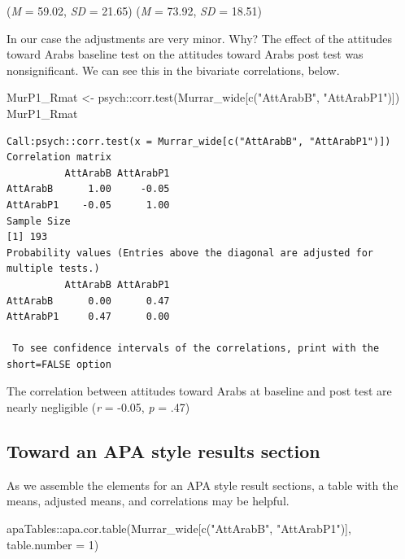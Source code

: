 \documentclass[
  11pt,
]{book}
\newenvironment{Shaded}{\begin{snugshade}}{\end{snugshade}}
\newcommand{\AttributeTok}[1]{\textcolor[rgb]{0.77,0.63,0.00}{#1}}
\newcommand{\DecValTok}[1]{\textcolor[rgb]{0.00,0.00,0.81}{#1}}
\newcommand{\FunctionTok}[1]{\textcolor[rgb]{0.00,0.00,0.00}{#1}}
\newcommand{\NormalTok}[1]{#1}
\newcommand{\OtherTok}[1]{\textcolor[rgb]{0.56,0.35,0.01}{#1}}
\newcommand{\SpecialCharTok}[1]{\textcolor[rgb]{0.00,0.00,0.00}{#1}}
\newcommand{\StringTok}[1]{\textcolor[rgb]{0.31,0.60,0.02}{#1}}
\begin{document}
(\emph{M} = 59.02, \emph{SD} = 21.65)
(\emph{M} = 73.92, \emph{SD} = 18.51)

In our case the adjustments are very minor. Why? The effect of the attitudes toward Arabs baseline test on the attitudes toward Arabs post test was nonsignificant. We can see this in the bivariate correlations, below.

\begin{Shaded}
\begin{Highlighting}[]
\NormalTok{MurP1\_Rmat }\OtherTok{\textless{}{-}}\NormalTok{ psych}\SpecialCharTok{::}\FunctionTok{corr.test}\NormalTok{(Murrar\_wide[}\FunctionTok{c}\NormalTok{(}\StringTok{"AttArabB"}\NormalTok{, }\StringTok{"AttArabP1"}\NormalTok{)])}
\NormalTok{MurP1\_Rmat}
\end{Highlighting}
\end{Shaded}

\begin{verbatim}
Call:psych::corr.test(x = Murrar_wide[c("AttArabB", "AttArabP1")])
Correlation matrix 
          AttArabB AttArabP1
AttArabB      1.00     -0.05
AttArabP1    -0.05      1.00
Sample Size 
[1] 193
Probability values (Entries above the diagonal are adjusted for multiple tests.) 
          AttArabB AttArabP1
AttArabB      0.00      0.47
AttArabP1     0.47      0.00

 To see confidence intervals of the correlations, print with the short=FALSE option
\end{verbatim}

The correlation between attitudes toward Arabs at baseline and post test are nearly negligible (\emph{r} = -0.05, \emph{p} = .47)

\hypertarget{toward-an-apa-style-results-section}{%
\subsection{Toward an APA style results section}\label{toward-an-apa-style-results-section}}

As we assemble the elements for an APA style result sections, a table with the means, adjusted means, and correlations may be helpful.

\begin{Shaded}
\begin{Highlighting}[]
\NormalTok{apaTables}\SpecialCharTok{::}\FunctionTok{apa.cor.table}\NormalTok{(Murrar\_wide[}\FunctionTok{c}\NormalTok{(}\StringTok{"AttArabB"}\NormalTok{, }\StringTok{"AttArabP1"}\NormalTok{)], }\AttributeTok{table.number =} \DecValTok{1}\NormalTok{)}
\end{Highlighting}
\end{Shaded}
\end{document}
